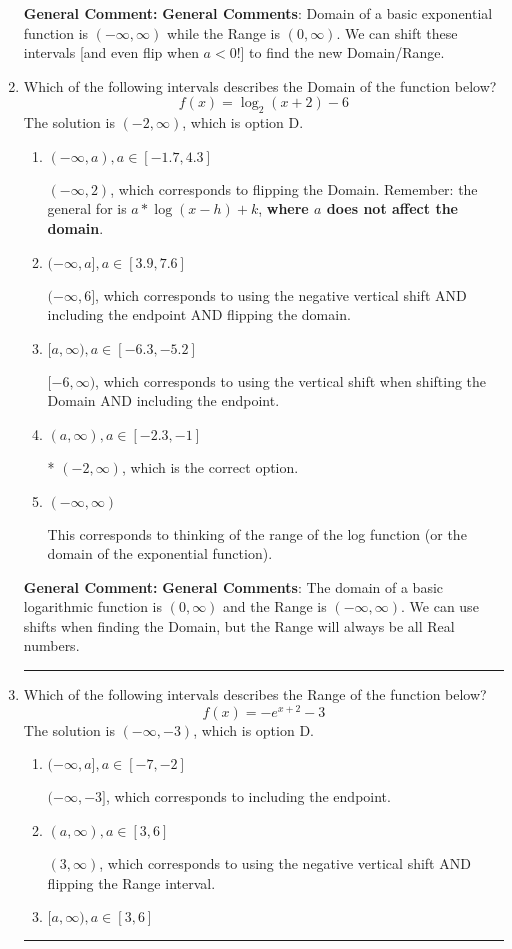 \documentclass{extbook}[14pt]
\newcommand{\litem}[1]{\item #1

\rule{\textwidth}{0.4pt}}
\begin{document}
\begin{enumerate}
{\textbf{General Comment:} \textbf{General Comments}: Domain of a basic exponential function is $(-\infty, \infty)$ while the Range is $(0, \infty)$. We can shift these intervals [and even flip when $a<0$!] to find the new Domain/Range.
}
\litem{
Which of the following intervals describes the Domain of the function below?
\[ f(x) = \log_2{(x+2)}-6 \]The solution is \( (-2, \infty) \), which is option D.\begin{enumerate}[label=\Alph*.]
\item \( (-\infty, a), a \in [-1.7, 4.3] \)

$(-\infty, 2)$, which corresponds to flipping the Domain. Remember: the general for is $a*\log(x-h)+k$, \textbf{where $a$ does not affect the domain}.
\item \( (-\infty, a], a \in [3.9, 7.6] \)

$(-\infty, 6]$, which corresponds to using the negative vertical shift AND including the endpoint AND flipping the domain.
\item \( [a, \infty), a \in [-6.3, -5.2] \)

$[-6, \infty)$, which corresponds to using the vertical shift when shifting the Domain AND including the endpoint.
\item \( (a, \infty), a \in [-2.3, -1] \)

* $(-2, \infty)$, which is the correct option.
\item \( (-\infty, \infty) \)

This corresponds to thinking of the range of the log function (or the domain of the exponential function).
\end{enumerate}

\textbf{General Comment:} \textbf{General Comments}: The domain of a basic logarithmic function is $(0, \infty)$ and the Range is $(-\infty, \infty)$. We can use shifts when finding the Domain, but the Range will always be all Real numbers.
}
\litem{
Which of the following intervals describes the Range of the function below?
\[ f(x) = -e^{x+2}-3 \]The solution is \( (-\infty, -3) \), which is option D.\begin{enumerate}[label=\Alph*.]
\item \( (-\infty, a], a \in [-7, -2] \)

$(-\infty, -3]$, which corresponds to including the endpoint.
\item \( (a, \infty), a \in [3, 6] \)

$(3, \infty)$, which corresponds to using the negative vertical shift AND flipping the Range interval.
\item \( [a, \infty), a \in [3, 6] \)


\end{enumerate}}
\end{enumerate}
\end{document}
